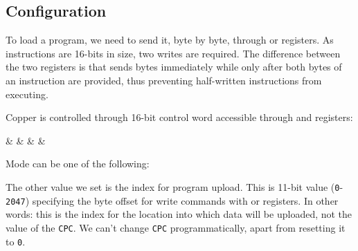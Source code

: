 \pagebreak
\subsection{Configuration}
\label{zx_next_copper_configuration}

To load a program, we need to send it, byte by byte, through  or  registers. As instructions are 16-bits in size, two writes are required. The difference between the two registers is that  sends bytes immediately while  only after both bytes of an instruction are provided, thus preventing half-written instructions from executing.

Copper is controlled through 16-bit control word accessible through  and  registers:

\begin{BitTableWord}[c][\PortTextXRef{62}][\PortTextXRef{61}]
	 &
		 & 
		 & 
		 &
		 \\
\end{BitTableWord}

Mode can be one of the following:

\begin{PortBitConfig}
\end{PortBitConfig}

The other value we set is the index for program upload. This is 11-bit value ({\tt 0}-{\tt 2047}) specifying the byte offset for write commands with  or  registers. In other words: this is the index for the location into which data will be uploaded, not the value of the {\tt CPC}. We can't change {\tt CPC} programmatically, apart from resetting it to {\tt 0}.


